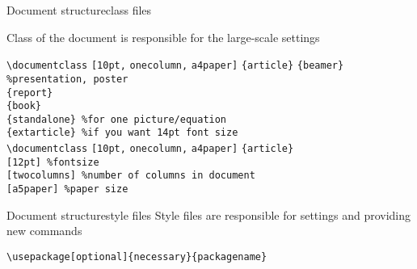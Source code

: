 \begin{frame}[fragile]{Document structure}{class files}

Class of the document is responsible for the large-scale settings
    \cprotect{} 
{
\scriptsize
\begin{tabbing}
\lstinline|\documentclass|\hspace{-1ex} \= \lstinline|[10pt,|  \= \lstinline|onecolumn,|  \=  \lstinline|a4paper]|\hspace{-1ex} \= \lstinline|{article}| \kill
\> \> \> \> \lstinline|{beamer} %presentation, poster| \\
\> \> \> \> \lstinline|{report}| \\
\> \> \> \> \lstinline|{book}| \\
\> \> \> \> \lstinline|{standalone} %for one picture/equation| \\
\> \> \> \> \lstinline|{extarticle} %if you want 14pt font size| \\
\lstinline|\documentclass| \> \lstinline|[10pt,|  \> \lstinline|onecolumn,|  \>  \lstinline|a4paper]| \> \lstinline|{article}| \\ 
\> \lstinline|[12pt] %fontsize| \> \\ 
\> \> \lstinline|[twocolumns] %number of columns in document| \> \\ 
\> \> \> \lstinline|[a5paper] %paper size| \> \\ 
\end{tabbing}}
\cprotect{}
\end{frame}

\begin{frame}[fragile]{Document structure}{style files}
     Style files are responsible for settings and providing new commands 
     
     \vfill
     \hspace{-1ex}
     \lstinline[basicstyle=\tt\large]|\usepackage[optional]{necessary}{packagename}|
     \vfill
\end{frame}


\cprotect{}
